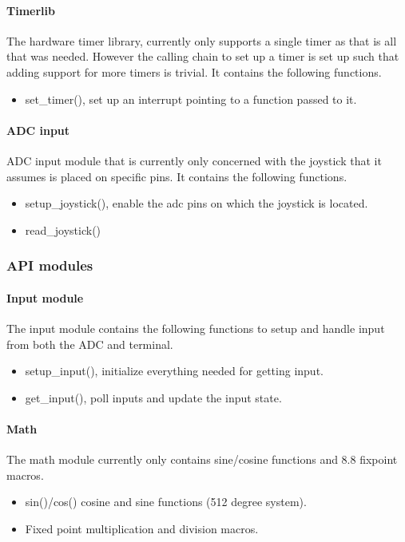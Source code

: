 \paragraph{Timerlib}
The hardware timer library, currently only supports a single timer as that is all that was needed.
However the calling chain to set up a timer is set up such that adding support for more timers is
trivial. It contains the following functions.
\begin{itemize}
	\item set\_timer(), set up an interrupt pointing to a function passed to it.
\end{itemize}

\paragraph{ADC input}
ADC input module that is currently only concerned with the joystick that it assumes is
placed on specific pins. It contains the following functions.
\begin{itemize}
	\item setup\_joystick(), enable the adc pins on which the joystick is located.
	\item read\_joystick()
\end{itemize}


\subsubsection{API modules}
\paragraph{Input module}
The input module contains the following functions to setup and handle input from
both the ADC and terminal.
\begin{itemize}
	\item setup\_input(), initialize everything needed for getting input.
	\item get\_input(), poll inputs and update the input state.
\end{itemize}

\paragraph{Math}
The math module currently only contains sine/cosine functions and 8.8 fixpoint macros.
\begin{itemize}
	\item sin()/cos() cosine and sine functions (512 degree system).
	\item Fixed point multiplication and division macros.
\end{itemize}

